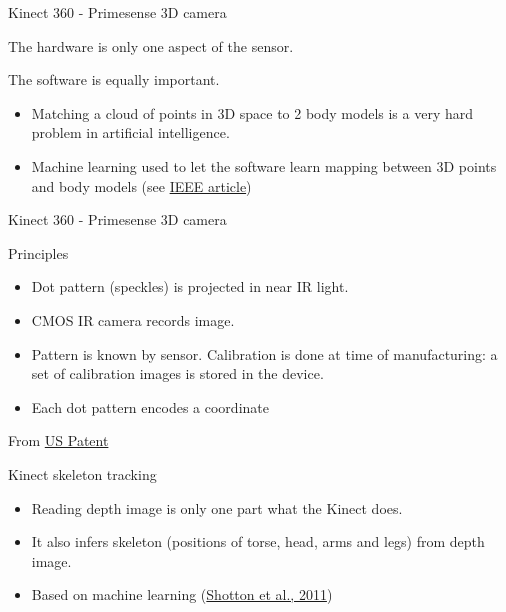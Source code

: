 \documentclass[compress]{beamer}
\begin{document}
\begin{frame}{Kinect 360 - Primesense 3D camera}

The hardware is only one aspect of the sensor.

The software is equally important.

\begin{itemize}

\item
  Matching a cloud of points in 3D space to 2 body models is a very hard
  problem in artificial intelligence.
\item
  Machine learning used to let the software learn mapping between 3D
  points and body models (see
  \href{http://www.theinstitute.ieee.org/portal/site/tionline/menuitem.130a3558587d56e8fb2275875bac26c8/index.jsp?\&pName=institute_level1_article\&TheCat=2201\&article=tionline/legacy/inst2011/jan11/featuretech.xml\&}{IEEE
  article})
\end{itemize}

\end{frame}

\begin{frame}{Kinect 360 - Primesense 3D camera}

Principles

\begin{itemize}

\item
  Dot pattern (speckles) is projected in near IR light.
\item
  CMOS IR camera records image.
\item
  Pattern is known by sensor. Calibration is done at time of
  manufacturing: a set of calibration images is stored in the device.
\item
  Each dot pattern encodes a coordinate
\end{itemize}

From
\href{http://worldwide.espacenet.com/publicationDetails/originalDocument?FT=D\&date=20100909\&DB=EPODOC\&locale=en_EP\&CC=US\&NR=2010225746A1\&KC=A1}{US
Patent}

\end{frame}

\begin{frame}{Kinect skeleton tracking}

\begin{itemize}

\item
  Reading depth image is only one part what the Kinect does.
\item
  It also infers skeleton (positions of torse, head, arms and legs) from
  depth image.
\item
  Based on machine learning
  (\href{http://research.microsoft.com/pubs/145347/BodyPartRecognition.pdf}{Shotton
  et al., 2011})
\end{itemize}

\end{frame}
\end{document}
